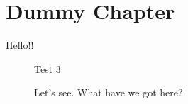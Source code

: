 \chapter{Dummy Chapter}

Hello!!

\begin{figure}[hbt!]
\centering Test 3
\caption{Let's see. What have we got here?}
\end{figure}
